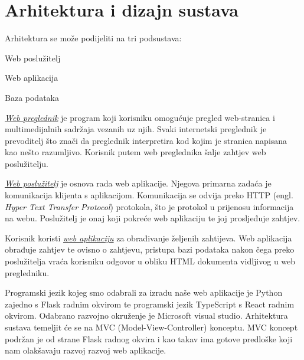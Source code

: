 \chapter{Arhitektura i dizajn sustava}
		
		Arhitektura se može podijeliti na tri podsustava:
		    \begin{packed_item}
		        \item Web poslužitelj
    		    \item Web aplikacija
    		    \item Baza podataka
		    \end{packed_item}
		    
	    \underline{\textit{Web preglednik}} je program koji korisniku omogućuje pregled web-stranica i multimedijalnih sadržaja vezanih uz njih. Svaki internetski preglednik je prevoditelj što znači da preglednik interpretira kod kojim je stranica napisana kao nešto razumljivo. Korisnik putem web preglednika šalje zahtjev web poslužitelju.
	    
	    \underline{\textit{Web poslužitelj}} je osnova rada web aplikacije. Njegova primarna zadaća je komunikacija klijenta s aplikacijom. Komunikacija se odvija preko HTTP (engl. \textit{Hyper Text Transfer Protocol}) protokola, što je protokol u prijenosu informacija na webu. Poslužitelj je onaj koji pokreće web aplikaciju te joj prosljeđuje zahtjev.

	    Korisnik koristi \underline{\textit{web aplikaciju}} za obrađivanje željenih zahtijeva. Web aplikacija obrađuje zahtjev te ovisno o zahtjevu, pristupa bazi podataka nakon čega preko poslužitelja vraća korisniku odgovor u obliku HTML dokumenta vidljivog u web pregledniku.
		
		Programski jezik kojeg smo odabrali za izradu naše web aplikacije je Python zajedno s Flask radnim okvirom te programski jezik TypeScript s React radnim okvirom. Odabrano razvojno okruženje je Microsoft visual studio. Arhitektura sustava temeljit će se na MVC (Model-View-Controller) konceptu. MVC koncept podržan je od strane Flask radnog okvira i kao takav ima gotove predloške koji nam olakšavaju razvoj razvoj web aplikacije.
		
